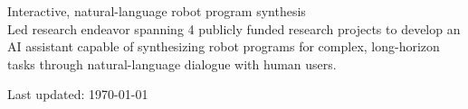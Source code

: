 \documentclass[11pt]{article} %
\begin{document}
Interactive, natural-language robot program synthesis\\
Led research endeavor spanning 4 publicly funded research projects to develop an AI assistant capable of synthesizing robot programs for complex, long-horizon tasks through natural-language dialogue with human users.


\vfill %


\begin{center}
	\scriptsize
	Last updated: \today
\end{center}

\end{document}
